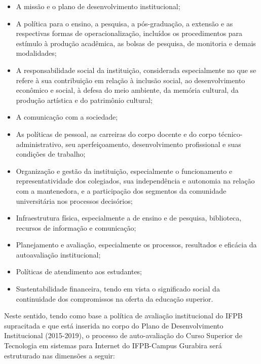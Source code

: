 \begin{itemize}
	\item A missão e o plano de desenvolvimento institucional;
	
	\item A política para o ensino, a pesquisa, a pós-graduação, a extensão e as respectivas formas de operacionalização, incluídos os procedimentos para estímulo à produção acadêmica, as bolsas de pesquisa, de monitoria e demais modalidades;

	\item A responsabilidade social da instituição, considerada especialmente no que se refere à sua contribuição em relação à inclusão social, ao desenvolvimento econômico e social, à defesa do meio ambiente, da memória cultural, da produção artística e do patrimônio cultural;

	\item A comunicação com a sociedade;

	\item As políticas de pessoal, as carreiras do corpo docente e do corpo técnico-administrativo, seu aperfeiçoamento, desenvolvimento profissional e suas condições de trabalho;

	\item Organização e gestão da instituição, especialmente o funcionamento e representatividade dos colegiados, sua independência e autonomia na relação com a mantenedora, e a participação dos segmentos da comunidade universitária nos processos decisórios;

	\item Infraestrutura física, especialmente a de ensino e de pesquisa, biblioteca, recursos de informação e comunicação;

	\item Planejamento e avaliação, especialmente os processos, resultados e eficácia da autoavaliação institucional;

	\item Políticas de atendimento aos estudantes;

	\item Sustentabilidade financeira, tendo em vista o significado social da continuidade dos compromissos na oferta da educação superior.

\end{itemize}


       Neste sentido, tendo como base a política de avaliação institucional do IFPB supracitada e que está inserida no corpo do Plano de Desenvolvimento Institucional (2015-2019), o processo de auto-avaliação do Curso Superior de Tecnologia em sistemas para Internet do IFPB-Campus Gurabira será estruturado nas dimensões a seguir:

